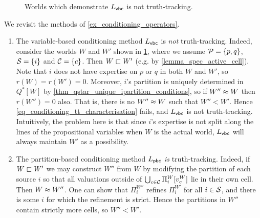 \begin{figure}
    \centering
    
    \caption{Worlds which demonstrate $L_{\mathsf{vbc}}{}$ is not truth-tracking.}
    \label{fig_vbc_counterexample}
\end{figure}

\begin{example}
    We revisit the methods of \cref{ex_conditioning_operators}.

    \begin{enumerate}

        \item The variable-based conditioning method $L_{\mathsf{vbc}}{}$ is \emph{not}
              truth-tracking. Indeed, consider the worlds $W$ and $W'$ shown in
              \cref{fig_vbc_counterexample}, where we assume $\mathcal{P} = \{p,
              q\}$, $\mathcal{S} = \{i\}$ and $\mathcal{C} = \{c\}$. Then $W \sqsubset W'$
              (e.g. by \cref{lemma_spec_active_cell}).
              Note that $i$ does not have expertise on $p$ or $q$ in both $W$
              and $W'$, so $r(W) = r(W') = 0$. Moreover, $i$'s partition is
              uniquely determined in $Q^*[W]$ by
              \cref{thm_qstar_unique_ipartition_conditions}, so if $W'' \approx
              W$ then $r(W'') = 0$ also. That is, there is no $W'' \approx W$
              such that $W'' < W'$. Hence
              \cref{eq_conditioning_tt_characterisation} fails, and $L_{\mathsf{vbc}}{}$
              is not truth-tracking.
              Intuitively, the problem here is that since $i$'s expertise is
              not split along the lines of the propositional variables when $W$
              is the actual world, $L_{\mathsf{vbc}}{}$ will always maintain $W'$ as a
              possibility.

          \item The partition-based conditioning method $L_{\mathsf{pbc}}{}$ \emph{is}
                truth-tracking. Indeed, if $W \sqsubset W'$ we may construct
                $W''$ from $W$ by modifying the partition of each source $i$ so
                that all valuations outside of $\bigcup_{c \in
                \mathcal{C}}{\Pi^W_i[v^W_c]}$ lie in their own cell.
                Then $W \approx W''$. One can show that $\Pi^{W''}_i$ refines
                $\Pi^{W'}_i$ for all $i \in \mathcal{S}$, and there is some $i$ for
                which the refinement is strict. Hence the partitions in $W''$
                contain strictly more cells, so $W'' < W'$.

    \end{enumerate}

\end{example}

